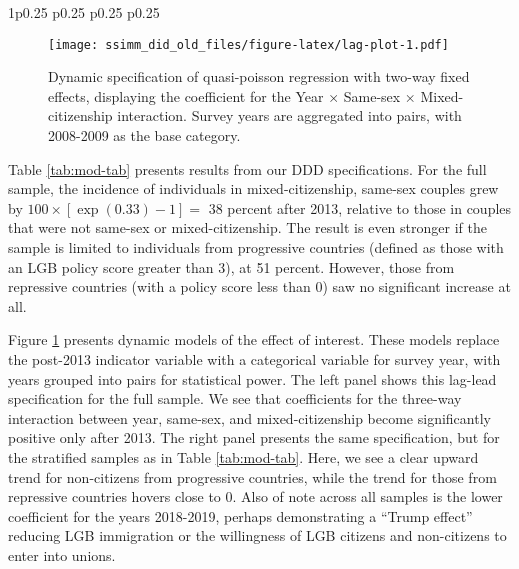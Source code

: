 \documentclass[
  12pt,
]{article}
\begin{document}
\begin{table}[ht]
\begin{centerbox}
\begin{threeparttable}
\begin{tabularx}{1\textwidth}{p{} p{} p{} p{}}
 \tabularnewline[-0.5pt]


\hhline{}
\end{tabularx}
\end{threeparttable}\par\end{centerbox}

\end{table}
 

\begin{figure}
\centering
\texttt{[image: ssimm\_did\_old\_files/figure-latex/lag-plot-1.pdf]}
\caption{\label{fig:lag-plot}Dynamic specification of quasi-poisson regression with two-way fixed effects, displaying the coefficient for the Year × Same-sex × Mixed-citizenship interaction. Survey years are aggregated into pairs, with 2008-2009 as the base category.}
\end{figure}

Table \ref{tab:mod-tab} presents results from our DDD specifications. For the full sample, the incidence of individuals in mixed-citizenship, same-sex couples grew by \(100 \times [\exp(0.33) -1] =\) 38 percent after 2013, relative to those in couples that were not same-sex or mixed-citizenship. The result is even stronger if the sample is limited to individuals from progressive countries (defined as those with an LGB policy score greater than 3), at 51 percent. However, those from repressive countries (with a policy score less than 0) saw no significant increase at all.

Figure \ref{fig:lag-plot} presents dynamic models of the effect of interest. These models replace the post-2013 indicator variable with a categorical variable for survey year, with years grouped into pairs for statistical power. The left panel shows this lag-lead specification for the full sample. We see that coefficients for the three-way interaction between year, same-sex, and mixed-citizenship become significantly positive only after 2013. The right panel presents the same specification, but for the stratified samples as in Table \ref{tab:mod-tab}. Here, we see a clear upward trend for non-citizens from progressive countries, while the trend for those from repressive countries hovers close to 0. Also of note across all samples is the lower coefficient for the years 2018-2019, perhaps demonstrating a ``Trump effect'' reducing LGB immigration or the willingness of LGB citizens and non-citizens to enter into unions.
\end{document}

